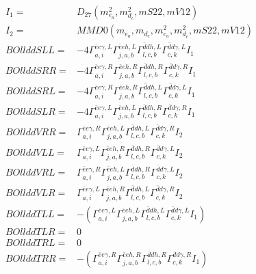 \documentclass[A4,landscape]{article}
\begin{document}
\begin{align} 
I_1 = & D_{27}(m^2_{e_{{a}}}, m^2_{d_{{c}}}, mS22, mV12) \\ 
I_2 = & MMD0(m_{e_{{a}}}, m_{d_{{c}}}, m^2_{e_{{a}}}, m^2_{d_{{c}}}, mS22, mV12) \\ 
  BOllddSLL= & -4  \Gamma^{\bar{e}e \gamma ,L}_{a, i} \Gamma^{\bar{e}e h ,L}_{j, a, b} \Gamma^{\bar{d}d h ,L}_{l, c, b} \Gamma^{\bar{d}d \gamma ,L}_{c, k} I_1 \\ 
  BOllddSRR= & -4  \Gamma^{\bar{e}e \gamma ,R}_{a, i} \Gamma^{\bar{e}e h ,R}_{j, a, b} \Gamma^{\bar{d}d h ,R}_{l, c, b} \Gamma^{\bar{d}d \gamma ,R}_{c, k} I_1 \\ 
  BOllddSRL= & -4  \Gamma^{\bar{e}e \gamma ,R}_{a, i} \Gamma^{\bar{e}e h ,R}_{j, a, b} \Gamma^{\bar{d}d h ,L}_{l, c, b} \Gamma^{\bar{d}d \gamma ,L}_{c, k} I_1 \\ 
  BOllddSLR= & -4  \Gamma^{\bar{e}e \gamma ,L}_{a, i} \Gamma^{\bar{e}e h ,L}_{j, a, b} \Gamma^{\bar{d}d h ,R}_{l, c, b} \Gamma^{\bar{d}d \gamma ,R}_{c, k} I_1 \\ 
  BOllddVRR= &  \Gamma^{\bar{e}e \gamma ,R}_{a, i} \Gamma^{\bar{e}e h ,L}_{j, a, b} \Gamma^{\bar{d}d h ,L}_{l, c, b} \Gamma^{\bar{d}d \gamma ,R}_{c, k} I_2 \\ 
  BOllddVLL= &  \Gamma^{\bar{e}e \gamma ,L}_{a, i} \Gamma^{\bar{e}e h ,R}_{j, a, b} \Gamma^{\bar{d}d h ,R}_{l, c, b} \Gamma^{\bar{d}d \gamma ,L}_{c, k} I_2 \\ 
  BOllddVRL= &  \Gamma^{\bar{e}e \gamma ,R}_{a, i} \Gamma^{\bar{e}e h ,L}_{j, a, b} \Gamma^{\bar{d}d h ,R}_{l, c, b} \Gamma^{\bar{d}d \gamma ,L}_{c, k} I_2 \\ 
  BOllddVLR= &  \Gamma^{\bar{e}e \gamma ,L}_{a, i} \Gamma^{\bar{e}e h ,R}_{j, a, b} \Gamma^{\bar{d}d h ,L}_{l, c, b} \Gamma^{\bar{d}d \gamma ,R}_{c, k} I_2 \\ 
  BOllddTLL= & -( \Gamma^{\bar{e}e \gamma ,L}_{a, i} \Gamma^{\bar{e}e h ,L}_{j, a, b} \Gamma^{\bar{d}d h ,L}_{l, c, b} \Gamma^{\bar{d}d \gamma ,L}_{c, k} I_1) \\ 
  BOllddTLR= & 0 \\ 
  BOllddTRL= & 0 \\ 
  BOllddTRR= & -( \Gamma^{\bar{e}e \gamma ,R}_{a, i} \Gamma^{\bar{e}e h ,R}_{j, a, b} \Gamma^{\bar{d}d h ,R}_{l, c, b} \Gamma^{\bar{d}d \gamma ,R}_{c, k} I_1) \\ 
\end{align} 
\end{document}
